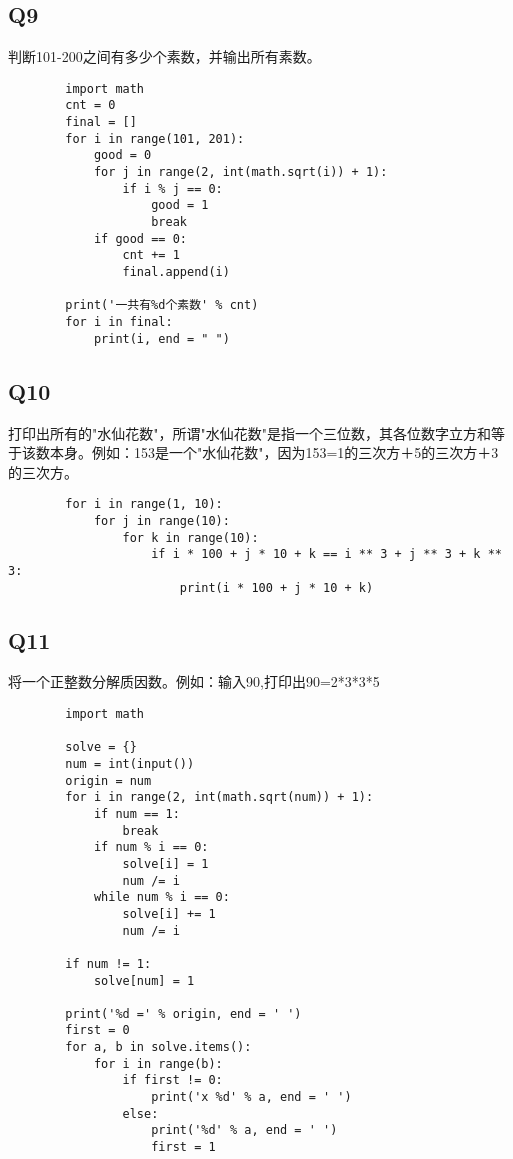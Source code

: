 \documentclass{article}
\begin{document}
    \subsection{Q9}
    判断101-200之间有多少个素数，并输出所有素数。
    \begin{verbatim}
        import math
        cnt = 0
        final = []
        for i in range(101, 201):
            good = 0
            for j in range(2, int(math.sqrt(i)) + 1):
                if i % j == 0:
                    good = 1
                    break
            if good == 0:
                cnt += 1
                final.append(i)

        print('一共有%d个素数' % cnt)
        for i in final:
            print(i, end = " ")
    \end{verbatim}

    \subsection{Q10}
    打印出所有的"水仙花数"，所谓"水仙花数"是指一个三位数，其各位数字立方和等于该数本身。例如：153是一个"水仙花数"，因为153=1的三次方＋5的三次方＋3的三次方。
    \begin{verbatim}
        for i in range(1, 10):
            for j in range(10):
                for k in range(10):
                    if i * 100 + j * 10 + k == i ** 3 + j ** 3 + k ** 3:
                        print(i * 100 + j * 10 + k)
    \end{verbatim}

    \subsection{Q11}
    将一个正整数分解质因数。例如：输入90,打印出90=2*3*3*5
    \begin{verbatim}
        import math

        solve = {}
        num = int(input())
        origin = num
        for i in range(2, int(math.sqrt(num)) + 1):
            if num == 1:
                break
            if num % i == 0:
                solve[i] = 1
                num /= i
            while num % i == 0:
                solve[i] += 1
                num /= i

        if num != 1:
            solve[num] = 1

        print('%d =' % origin, end = ' ')
        first = 0
        for a, b in solve.items():
            for i in range(b):
                if first != 0:
                    print('x %d' % a, end = ' ')
                else:
                    print('%d' % a, end = ' ')
                    first = 1
    \end{verbatim}
\end{document}
